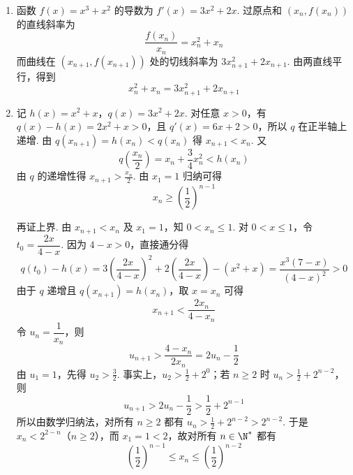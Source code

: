\begin{solution}
\begin{enumerate}
\item
函数 \(f(x)=x^3+x^2\) 的导数为 \(f'(x)=3x^2+2x\). 过原点和 \((x_n,f(x_n))\) 的直线斜率为
\[
\frac{f(x_n)}{x_n}=x_n^2+x_n
\]
而曲线在 \((x_{n+1},f(x_{n+1}))\) 处的切线斜率为 \(3x_{n+1}^2+2x_{n+1}\). 由两直线平行，得到
\[
x_n^2+x_n=3x_{n+1}^2+2x_{n+1}
\]

\item
记 \(h(x)=x^2+x\)，\(q(x)=3x^2+2x\). 对任意 \(x>0\)，有 \(q(x)-h(x)=2x^2+x>0\)，且 \(q'(x)=6x+2>0\)，所以 \(q\) 在正半轴上递增. 由 \(q(x_{n+1})=h(x_n)<q(x_n)\) 得 \(x_{n+1}<x_n\). 又
\[
q\left(\frac{x_n}{2}\right)=x_n+\frac34x_n^2<h(x_n)
\]
由 \(q\) 的递增性得 \(x_{n+1}>\frac{x_n}{2}\). 由 \(x_1=1\) 归纳可得
\[
x_n\geqslant\left(\frac12\right)^{n-1}
\]

再证上界. 由 \(x_{n+1}<x_n\) 及 \(x_1=1\)，知 \(0<x_n\leqslant1\). 对 \(0<x\leqslant1\)，令 \(t_0=\dfrac{2x}{4-x}\). 因为 \(4-x>0\)，直接通分得
\[
q(t_0)-h(x)=3\left(\frac{2x}{4-x}\right)^2+2\left(\frac{2x}{4-x}\right)-(x^2+x)=\frac{x^3(7-x)}{(4-x)^2}>0
\]
由于 \(q\) 递增且 \(q(x_{n+1})=h(x_n)\)，取 \(x=x_n\) 可得
\[
x_{n+1}<\frac{2x_n}{4-x_n}
\]
令 \(u_n=\dfrac1{x_n}\)，则
\[
u_{n+1}>\frac{4-x_n}{2x_n}=2u_n-\frac12
\]
由 \(u_1=1\)，先得 \(u_2>\frac32\). 事实上，\(u_2>\frac12+2^0\)；若 \(n\geqslant2\) 时 \(u_n>\frac12+2^{n-2}\)，则
\[
u_{n+1}>2u_n-\frac12>\frac12+2^{n-1}
\]
所以由数学归纳法，对所有 \(n\geqslant2\) 都有 \(u_n>\frac12+2^{n-2}>2^{n-2}\). 于是 \(x_n<2^{2-n}\)（\(n\geqslant2\)），而 \(x_1=1<2\)，故对所有 \(n\in\N^*\) 都有
\[
\left(\frac12\right)^{n-1}\leqslant x_n\leqslant\left(\frac12\right)^{n-2}
\]
\end{enumerate}
\end{solution}
